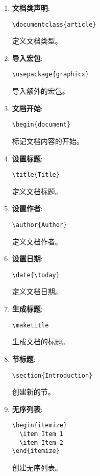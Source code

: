 \documentclass{ctexart}
\begin{document}
\begin{enumerate}[label=\arabic*.]
\item \textbf{文档类声明}:
\begin{lstlisting}
\documentclass{article}
\end{lstlisting}
定义文档类型。

\item \textbf{导入宏包}:
\begin{lstlisting}
\usepackage{graphicx}
\end{lstlisting}
导入额外的宏包。

\item \textbf{文档开始}:
\begin{lstlisting}
\begin{document}
\end{lstlisting}
标记文档内容的开始。

\item \textbf{设置标题}:
\begin{lstlisting}
\title{Title}
\end{lstlisting}
定义文档标题。

\item \textbf{设置作者}:
\begin{lstlisting}
\author{Author}
\end{lstlisting}
定义文档作者。

\item \textbf{设置日期}:
\begin{lstlisting}
\date{\today}
\end{lstlisting}
定义文档日期。

\item \textbf{生成标题}:
\begin{lstlisting}
\maketitle
\end{lstlisting}
生成文档的标题。

\item \textbf{节标题}:
\begin{lstlisting}
\section{Introduction}
\end{lstlisting}
创建新的节。

\item \textbf{无序列表}:
\begin{lstlisting}
\begin{itemize}
  \item Item 1
  \item Item 2
\end{itemize}
\end{lstlisting}
创建无序列表。


\end{enumerate}
\end{document}

